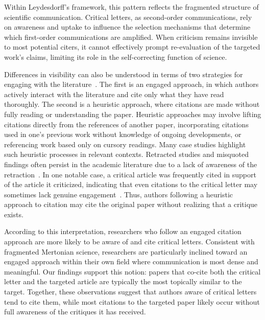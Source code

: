 \documentclass[12pt,a4paper]{article}
\numberwithin{equation}{section}
\begin{document}
Within Leydesdorff's framework, this pattern reflects the fragmented structure of scientific communication. 
Critical letters, as second-order communications, rely on awareness and uptake to influence the selection mechanisms that determine which first-order communications are amplified. 
When criticism remains invisible to most potential citers, it cannot effectively prompt re-evaluation of the targeted work's claims, limiting its role in the self-correcting function of science.

Differences in visibility can also be understood in terms of two strategies for engaging with the literature~\cite{woo_2024_retractions}.
The first is an engaged approach, in which authors actively interact with the literature and cite only what they have read thoroughly.
The second is a heuristic approach, where citations are made without fully reading or understanding the paper.
Heuristic approaches may involve lifting citations directly from the references of another paper, incorporating citations used in one's previous work without knowledge of ongoing developments, or referencing work based only on cursory readings. 
Many case studies highlight such heuristic processes in relevant contexts.
Retracted studies and misquoted findings often persist in the academic literature due to a lack of awareness of the retraction~\cite{schneider_2020_retraction, leung_2017_letter, hsiao_2021_retracted}.
In one notable case, a critical article was frequently cited in support of the article it criticized, indicating that even citations to the critical letter may sometimes lack genuine engagement~\cite{stang_2018_quotation}.
Thus, authors following a heuristic approach to citation may cite the original paper without realizing that a critique exists.

According to this interpretation, researchers who follow an engaged citation approach are more likely to be aware of and cite critical letters.
Consistent with fragmented Mertonian science, researchers are particularly inclined toward an engaged approach within their own field where communication is most dense and meaningful.
Our findings support this notion: papers that co-cite both the critical letter and the targeted article are typically the most topically similar to the target.
Together, these observations suggest that authors aware of critical letters tend to cite them, while most citations to the targeted paper likely occur without full awareness of the critiques it has received.
\end{document}
